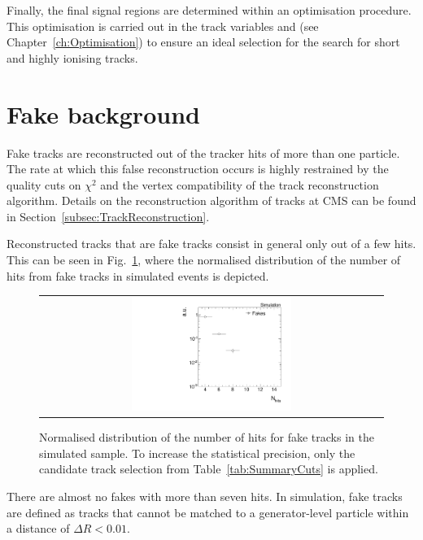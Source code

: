 Finally, the final signal regions are determined within an optimisation procedure.
This optimisation is carried out in the track variables \pt and \dedx (see Chapter~\ref{ch:Optimisation}) to ensure an ideal selection for the search for short and  highly ionising tracks.

\section{Fake background}
\label{sec:FakeBkg}
Fake tracks are reconstructed out of the tracker hits of more than one particle.
The rate at which this false reconstruction occurs is highly restrained by the quality cuts on $\chi^2$ and the vertex compatibility of the track reconstruction algorithm.
Details on the reconstruction algorithm of tracks at CMS can be found in Section~\ref{subsec:TrackReconstruction}.

Reconstructed tracks that are fake tracks consist in general only out of a few hits.
This can be seen in Fig.~\ref{fig:NValidFakes}, where the normalised distribution of the number of hits from fake tracks in simulated \WJets events is depicted.
\begin{figure}[!b]
  \centering 
  \begin{tabular}{c}
    \includegraphics[width=0.48\textwidth]{figures/analysis/Background/NValidForFakes_chiTracksfullSelectionNoQCDCutsNoTrigger.pdf}
  \end{tabular}
  \caption{Normalised distribution of the number of hits for fake tracks in the simulated \WJets sample. To increase the statistical precision, only the candidate track selection from Table~\ref{tab:SummaryCuts} is applied.}
  \label{fig:NValidFakes}
\end{figure}
There are almost no fakes with more than seven hits.
In simulation, fake tracks are defined as tracks that cannot be matched to a generator-level particle within a distance of $\Delta R < 0.01$.

